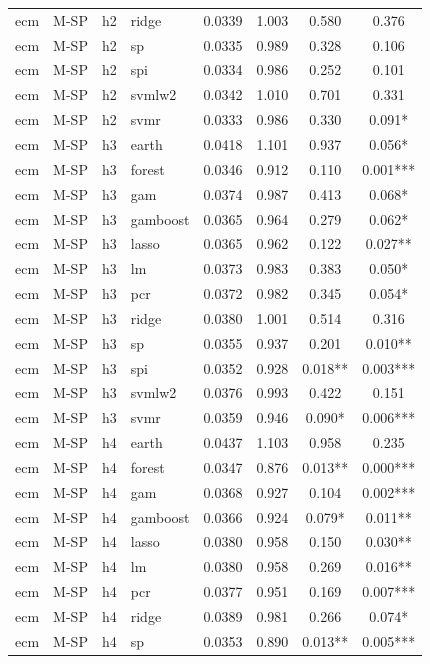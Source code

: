 \begin{ThreePartTable}
\begin{longtable}[t]{llclcccc}
ecm & M-SP & h2 & ridge & 0.0339 & 1.003 & 0.580 & 0.376\\
ecm & M-SP & h2 & sp & 0.0335 & 0.989 & 0.328 & 0.106\\
ecm & M-SP & h2 & spi & 0.0334 & 0.986 & 0.252 & 0.101\\
ecm & M-SP & h2 & svmlw2 & 0.0342 & 1.010 & 0.701 & 0.331\\
ecm & M-SP & h2 & svmr & 0.0333 & 0.986 & 0.330 & 0.091*\\
\addlinespace
ecm & M-SP & h3 & earth & 0.0418 & 1.101 & 0.937 & 0.056*\\
ecm & M-SP & h3 & forest & 0.0346 & 0.912 & 0.110 & 0.001***\\
ecm & M-SP & h3 & gam & 0.0374 & 0.987 & 0.413 & 0.068*\\
ecm & M-SP & h3 & gamboost & 0.0365 & 0.964 & 0.279 & 0.062*\\
ecm & M-SP & h3 & lasso & 0.0365 & 0.962 & 0.122 & 0.027**\\
ecm & M-SP & h3 & lm & 0.0373 & 0.983 & 0.383 & 0.050*\\
ecm & M-SP & h3 & pcr & 0.0372 & 0.982 & 0.345 & 0.054*\\
ecm & M-SP & h3 & ridge & 0.0380 & 1.001 & 0.514 & 0.316\\
ecm & M-SP & h3 & sp & 0.0355 & 0.937 & 0.201 & 0.010**\\
ecm & M-SP & h3 & spi & 0.0352 & 0.928 & 0.018** & 0.003***\\
ecm & M-SP & h3 & svmlw2 & 0.0376 & 0.993 & 0.422 & 0.151\\
ecm & M-SP & h3 & svmr & 0.0359 & 0.946 & 0.090* & 0.006***\\
\addlinespace
ecm & M-SP & h4 & earth & 0.0437 & 1.103 & 0.958 & 0.235\\
ecm & M-SP & h4 & forest & 0.0347 & 0.876 & 0.013** & 0.000***\\
ecm & M-SP & h4 & gam & 0.0368 & 0.927 & 0.104 & 0.002***\\
ecm & M-SP & h4 & gamboost & 0.0366 & 0.924 & 0.079* & 0.011**\\
ecm & M-SP & h4 & lasso & 0.0380 & 0.958 & 0.150 & 0.030**\\
ecm & M-SP & h4 & lm & 0.0380 & 0.958 & 0.269 & 0.016**\\
ecm & M-SP & h4 & pcr & 0.0377 & 0.951 & 0.169 & 0.007***\\
ecm & M-SP & h4 & ridge & 0.0389 & 0.981 & 0.266 & 0.074*\\
ecm & M-SP & h4 & sp & 0.0353 & 0.890 & 0.013** & 0.005***\\

\end{longtable}
\end{ThreePartTable}
